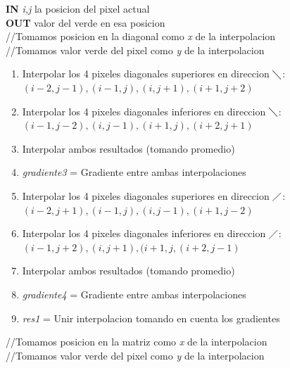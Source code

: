 \documentclass[10pt, a4paper]{article}
\begin{document}
\begin{algorithm}[H]
\textbf{IN} \textit{i,j} la posicion del pixel actual \\
\textbf{OUT} valor del verde en esa posicion\\
//Tomamos posicion en la diagonal  como \textit{x} de la interpolacion\\
//Tomamos valor verde del pixel como \textit{y} de la interpolacion\\

\begin{enumerate}[label=\bfseries Step \arabic*:]
\item Interpolar los 4 pixeles diagonales superiores en direccion $\diagdown$: $(i-2,j-1),(i-1,j),(i,j+1),(i+1,j+2)$\\
\item Interpolar los 4 pixeles diagonales inferiores en direccion $\diagdown$: $(i-1, j-2),(i, j-1),(i+1, j),(i+2, j+1)$\\
\item Interpolar ambos resultados (tomando promedio)\\
\item \textit{gradiente3} = Gradiente entre ambas interpolaciones\\
\item Interpolar los 4 pixeles diagonales superiores en direccion $\diagup$: $(i-2, j+1),(i-1, j), (i, j-1), (i+1, j-2)$
\item Interpolar los 4 pixeles diagonales inferiores en direccion $\diagup$: $(i-1, j+2),(i, j+1), (i+1, j, (i+2, j-1)$
\item Interpolar ambos resultados (tomando promedio)\\
\item \textit{gradiente4} = Gradiente entre ambas interpolaciones\\
\item \textit{res1} = Unir interpolacion tomando en cuenta los gradientes\\
\end{enumerate}

//Tomamos posicion en la matriz  como \textit{x} de la interpolacion\\
//Tomamos valor verde del pixel como \textit{y} de la interpolacion\\


\end{algorithm}
\end{document}
